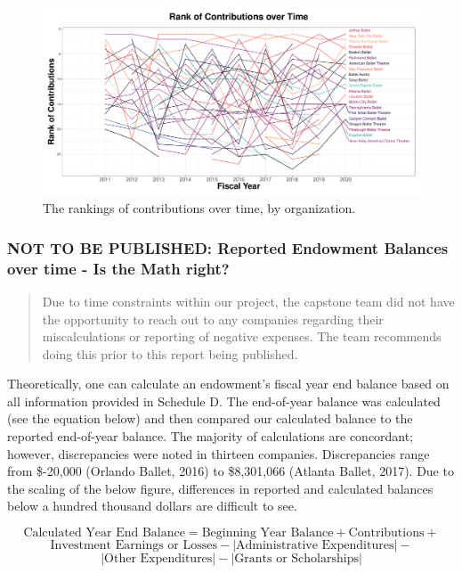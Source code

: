 \documentclass[Dance Data
Project,article,submit,moreauthors,pdftex]{mdpi}
\begin{document}
\begin{figure}[H]
\includegraphics[width=0.9\linewidth,]{../images/ranking-contributions} \caption{\label{fig:rankings-contributions}The rankings of contributions over time, by organization.}\label{fig:ranking-contributions}
\end{figure}

\hypertarget{not-to-be-published-reported-endowment-balances-over-time---is-the-math-right}{%
\subsubsection{NOT TO BE PUBLISHED: Reported Endowment Balances over
time - Is the Math
right?}\label{not-to-be-published-reported-endowment-balances-over-time---is-the-math-right}}

\begin{quote}
Due to time constraints within our project, the capstone team did not
have the opportunity to reach out to any companies regarding their
miscalculations or reporting of negative expenses. The team recommends
doing this prior to this report being published.
\end{quote}

Theoretically, one can calculate an endowment's fiscal year end balance
based on all information provided in Schedule D. The end-of-year balance
was calculated (see the equation below) and then compared our calculated
balance to the reported end-of-year balance. The majority of
calculations are concordant; however, discrepancies were noted in
thirteen companies. Discrepancies range from \$-20,000 (Orlando Ballet,
2016) to \$8,301,066 (Atlanta Ballet, 2017). Due to the scaling of the
below figure, differences in reported and calculated balances below a
hundred thousand dollars are difficult to see.

\[\text{Calculated Year End Balance} = \text{Beginning Year Balance} + \text{Contributions} +\]
\[ \text{Investment Earnings or Losses} - |\text{Administrative Expenditures}| -\]
\[|\text{Other Expenditures}| - | \text{Grants or Scholarships}| \tag{1}\]
\end{document}
